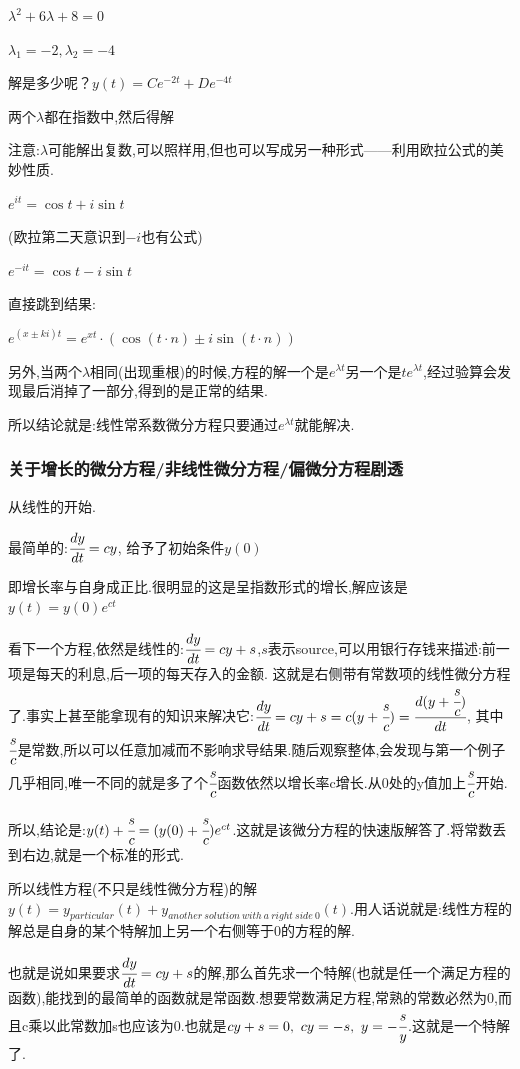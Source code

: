 \documentclass[UTF8,12pt]{ctexbook}
\begin{document}
{{{{$\lambda^2 + 6\lambda + 8 = 0$

$\lambda_1 = -2, \lambda_2 = -4$

解是多少呢？$y(t) = Ce^{-2t} + De^{-4t}$

两个$\lambda$都在指数中,然后得解

注意:$\lambda$可能解出复数,可以照样用,但也可以写成另一种形式——利用欧拉公式的美妙性质.

$e^{it} = \cos t + i\sin t$

(欧拉第二天意识到$-i$也有公式)

$e^{-it} = \cos t -i\sin t$

直接跳到结果:

$e^{(x \pm ki)t} = e^{xt}\cdot(\cos(t\cdot n) \pm i\sin(t\cdot n))$

另外,当两个$\lambda$相同(出现重根)的时候,方程的解一个是$e^{\lambda t}$另一个是$te^{\lambda t}$,经过验算会发现最后消掉了一部分,得到的是正常的结果.

所以结论就是:线性常系数微分方程只要通过$e^{\lambda t}$就能解决.
}%

\subsubsection{关于增长的微分方程/非线性微分方程/偏微分方程剧透}{
  从线性的开始.

  最简单的:$\cfrac{dy}{dt} = cy$, 给予了初始条件$y(0)$

  即增长率与自身成正比.很明显的这是呈指数形式的增长,解应该是$y(t) = y(0)e^{ct}$

  看下一个方程,依然是线性的:$\cfrac{dy}{dt} = cy + s$,$s$表示source,可以用银行存钱来描述:前一项是每天的利息,后一项的每天存入的金额.
  这就是右侧带有常数项的线性微分方程了.事实上甚至能拿现有的知识来解决它:$\cfrac{dy}{dt} = cy + s = c(y + \cfrac{s}{c}) = \cfrac{d(y + \cfrac{s}{c})}{dt}$, 其中$\cfrac{s}{c}$是常数,所以可以任意加减而不影响求导结果.随后观察整体,会发现与第一个例子几乎相同,唯一不同的就是多了个$\cfrac{s}{c}$函数依然以增长率c增长.从0处的y值加上$\cfrac{s}{c}$开始.

  所以,结论是:$y(t) + \cfrac{s}{c} = (y(0) + \cfrac{s}{c})e^{ct}$.这就是该微分方程的快速版解答了.将常数丢到右边,就是一个标准的形式.

  所以线性方程(不只是线性微分方程)的解$y(t) = y_{particular}(t) + y_{another\ solution\ with\ a\ right\ side\ 0}(t)$.用人话说就是:线性方程的解总是自身的某个特解加上另一个右侧等于0的方程的解.

  也就是说如果要求$\cfrac{dy}{dt} = cy + s$的解,那么首先求一个特解(也就是任一个满足方程的函数),能找到的最简单的函数就是常函数.想要常数满足方程,常熟的常数必然为0,而且c乘以此常数加s也应该为0.也就是$cy + s = 0,\ cy = -s, \ y = -\cfrac{s}{y}$.这就是一个特解了.

}}}}
\end{document}
